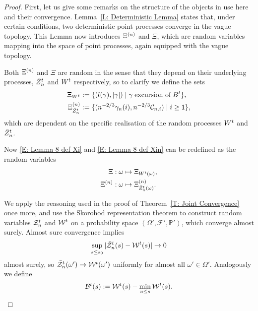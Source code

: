 \begin{proof}
	First, let us give some remarks on the structure of the objects in use here and their convergence.
	Lemma~\ref{L: Deterministic Lemma} states that, under certain conditions, two deterministic point processes converge in the vague topology.
	This Lemma now introduces $\Xi^{(n)}$ and $\Xi$, which are random variables mapping into the space of point processes, again equipped with the vague topology.
	
	Both $\Xi^{(n)}$ and $\Xi$ are random in the sense that they depend on their underlying processes, $\bar{Z}^t_n$ and $W^t$ respectively,
	so to clarify we define the sets
	\begin{equation} \label{E: Lemma 8 def XiWt}
	\begin{aligned}
	\Xi_{W^t} &:= \{ (l(\gamma), |\gamma|) \; | \; \gamma \; \text{excursion of} \; B^t \}, \\
	\Xi^{(n)}_{\bar{Z}^t_n} &:= \{ ( n^{-2 / 3} \gamma_n(i), n^{-2 / 3} \mathcal{C}_{n,i} ) \; | \; i \geq 1 \},
	\end{aligned}
	\end{equation}
	which are dependent on the specific realisation of the random processes $W^t$ and $\bar{Z}^t_n$.
	
	Now \eqref{E: Lemma 8 def Xi} and \eqref{E: Lemma 8 def Xin} can be redefined as the random variables
	\begin{equation} \label{E: Lemma 8 def Xi Xin}
	\begin{aligned}
	\Xi : \; &\omega \mapsto \Xi_{W^t(\omega)}, \\
	\Xi^{(n)} : \; &\omega \mapsto \Xi^{(n)}_{\bar{Z}^t_n(\omega)}.
	\end{aligned}
	\end{equation}
	
	We apply the reasoning used in the proof of Theorem~\ref{T: Joint Convergence} once more,
	and use the Skorohod representation theorem to construct random variables
	$\bar{\mathcal{Z}}^t_n$ and $\mathcal{W}^t$ on a probability space $(\Omega', \mathcal{F}', \mathbb{P}')$,
	which converge almost surely.
	Almost sure convergence implies
	\begin{equation}
	\sup_{s \leq s_0}|\bar{\mathcal{Z}}^t_n(s) - \mathcal{W}^t(s)| \rightarrow 0
	\end{equation}
	almost surely,
	so $\bar{\mathcal{Z}}^t_n(\omega') \rightarrow \mathcal{W}^t(\omega')$ uniformly for almost all $\omega' \in \Omega'$. 
	Analogously we define
	\begin{equation}
		\mathcal{B}^t(s) := \mathcal{W}^t(s) - \min_{u \leq s}\mathcal{W}^t(s).
	\end{equation}
	

\end{proof}
